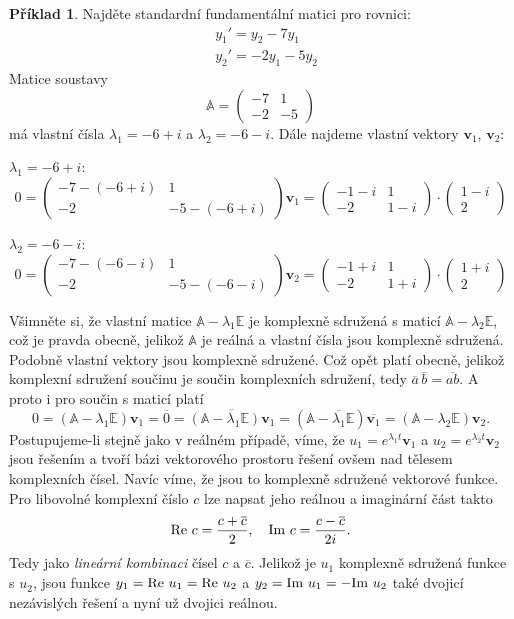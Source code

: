 \documentclass[a4paper, 12pt]{book}
\theoremstyle{definition}
\newtheorem{example}[theorem]{Příklad}
\def\vc#1{\mathbf{\boldsymbol{#1}}}     %
\def\tn#1{{\mathbb{#1}}}    %
\def\close#1{\overline{#1}}
\begin{document}
\begin{example}
Najděte standardní fundamentální matici pro rovnici:
 \begin{align*}
     &y_1'=y_2-7y_1\\
     &y_2'=-2y_1-5y_2
\end{align*}
Matice soustavy 
\[
  \tn A = \begin{pmatrix}-7&1\\-2&-5\end{pmatrix}
\]
má vlastní čísla $\lambda_1=-6+i$ a $\lambda_2=-6-i$. Dále najdeme vlastní vektory $\vc v_1$, $\vc v_2$:
\begin{description}
  \item $\lambda_1=-6+i$:
  \[
    0=\begin{pmatrix}-7-(-6+i)&1\\-2&-5-(-6+i)\end{pmatrix}\vc v_1
    =\begin{pmatrix}-1-i&1\\-2&1-i\end{pmatrix}\cdot 
     \begin{pmatrix}1-i\\2\end{pmatrix}
  \]
  \item $\lambda_2=-6-i$:
  \[
    0=\begin{pmatrix}-7-(-6-i)&1\\-2&-5-(-6-i)\end{pmatrix}\vc v_2
    =\begin{pmatrix}-1+i&1\\-2&1+i\end{pmatrix}\cdot 
     \begin{pmatrix}1+i\\2\end{pmatrix}
  \]
\end{description}

Všimněte si, že vlastní matice $\tn A-\lambda_1 \tn E$ je komplexně sdružená s maticí
$\tn A-\lambda_2 \tn E$, což je pravda obecně, jelikož $\tn A$ je reálná a vlastní čísla jsou komplexně sdružená.
Podobně vlastní vektory jsou komplexně sdružené. Což opět platí obecně, jelikož komplexní sdružení
součinu je součin komplexních sdružení, tedy $\close a\,\close b=\close{ab}$. A proto i
pro součin s maticí platí
\[
0=(\tn A-\lambda_1 \tn E)\vc v_1=\close{0}=\close{(\tn A-\lambda_1 \tn E)\vc v_1}
=(\tn A-\close{\lambda_1} \tn E)\close{\vc v_1}=(\tn A-\lambda_2 \tn E)\vc v_2.
\]
Postupujeme-li stejně jako v reálném případě, víme, že $u_1=e^{\lambda_1 t}\vc v_1$ a $u_2=e^{\lambda_2 t}\vc v_2$
jsou řešením a tvoří bázi vektorového prostoru řešení ovšem nad tělesem komplexních čísel.
Navíc víme, že jsou to komplexně sdružené vektorové funkce. Pro libovolné komplexní číslo $c$
lze napsat jeho reálnou a imaginární část takto
\[
   {\rm Re}\ c=\frac{c+\close{c}}{2},\quad{\rm Im}\ c=\frac{c-\close{c}}{2i}.
\]
Tedy jako {\it lineární kombinaci} čísel $c$ a $\close{c}$.
Jelikož je $u_1$ komplexně sdružená funkce s $u_2$, jsou funkce $y_1={\rm Re}\ u_1={\rm Re}\ u_2$ a
$y_2={\rm Im}\ u_1=-{\rm Im}\ u_2$ také dvojicí nezávislých řešení a nyní už dvojici reálnou.



\end{example}
\end{document}

